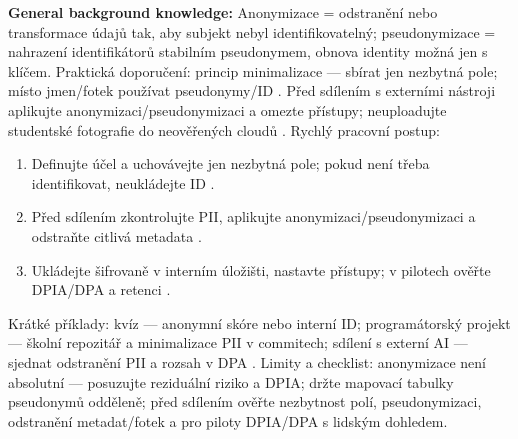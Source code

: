 \textbf{General background knowledge:} Anonymizace = odstranění nebo transformace údajů tak, aby subjekt nebyl identifikovatelný; pseudonymizace = nahrazení identifikátorů stabilním pseudonymem, obnova identity možná jen s klíčem.
Praktická doporučení: princip minimalizace — sbírat jen nezbytná pole; místo jmen/fotek používat pseudonymy/ID \cite{kb_ai_101_tipu_pdf_04e4a115_page_8_1}.
Před sdílením s externími nástroji aplikujte anonymizaci/pseudonymizaci a omezte přístupy; neuploadujte studentské fotografie do neověřených cloudů \cite{kb_ai_101_tipu_pdf_04e4a115_page_8_1,kb_ai_101_tipu_pdf_04e4a115_page_53_2}.
Rychlý pracovní postup:
\begin{enumerate}
\item Definujte účel a uchovávejte jen nezbytná pole; pokud není třeba identifikovat, neukládejte ID \cite{kb_ai_101_tipu_pdf_04e4a115_page_8_1}.
\item Před sdílením zkontrolujte PII, aplikujte anonymizaci/pseudonymizaci a odstraňte citlivá metadata \cite{kb_ai_101_tipu_pdf_04e4a115_page_8_1}.
\item Ukládejte šifrovaně v interním úložišti, nastavte přístupy; v pilotech ověřte DPIA/DPA a retenci \cite{kb_ai_101_tipu_pdf_04e4a115_page_8_1,kb_malinka_chatgpt_ve_vyuce_dva_roky_pote_2024_pdf_90bc3aaf_page_12_1}.
\end{enumerate}
Krátké příklady: kvíz — anonymní skóre nebo interní ID; programátorský projekt — školní repozitář a minimalizace PII v commitech; sdílení s externí AI — sjednat odstranění PII a rozsah v DPA \cite{kb_ai_101_tipu_pdf_04e4a115_page_8_1,kb_ai_101_tipu_pdf_04e4a115_page_53_2,kb_malinka_chatgpt_ve_vyuce_dva_roky_pote_2024_pdf_90bc3aaf_page_12_1}.
Limity a checklist: anonymizace není absolutní — posuzujte reziduální riziko a DPIA; držte mapovací tabulky pseudonymů odděleně; před sdílením ověřte nezbytnost polí, pseudonymizaci, odstranění metadat/fotek a pro piloty DPIA/DPA s lidským dohledem.